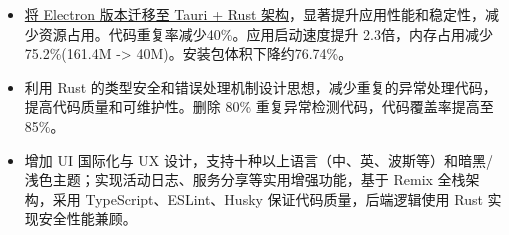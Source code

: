 \documentclass{resume}
\newcommand{\en}[1]{}
\newcommand{\zh}[1]{#1}
\begin{document}
\en{\datedsubsection{\textbf{\href{https://github.com/shaonhuang/V2rayX}{V2rayX (Rust/Tauri 2 Refactor)}}}{}}
\zh{}
\begin{itemize}
    \item \en{Led the migration of V2rayX from Electron to a modern Rust + Tauri architecture, achieving substantial performance improvements. Reduced code duplication by 40\%, improved startup speed by 2.3x, decreased memory usage by 75.2\%, and minimized installer size by 76.74\%.}
          \zh{\href{\detokenize{https://shaonhuang.vercel.app/posts/v2rayx-refactor}}{将 Electron 版本迁移至 Tauri + Rust 架构}，显著提升应用性能和稳定性，减少资源占用。代码重复率减少40\%。应用启动速度提升 2.3倍，内存占用减少 75.2\%(161.4M -> 40M)。安装包体积下降约76.74\%。}
    \item \en{Applied advanced Rust paradigms for type safety and error handling, eliminating 80\% of redundant exception logic and increasing code coverage to 85\%.}
          \zh{利用 Rust 的类型安全和错误处理机制设计思想，减少重复的异常处理代码，提高代码质量和可维护性。删除 80\% 重复异常检测代码，代码覆盖率提高至 85\%。}
    \item \en{Implemented comprehensive UI internationalization (10+ languages) and major UX enhancements including dark/light themes and activity logging. Built with Remix architecture using TypeScript, ESLint, and Husky for code quality.}
          \zh{增加 UI 国际化与 UX 设计，支持十种以上语言（中、英、波斯等）和暗黑/浅色主题；实现活动日志、服务分享等实用增强功能，基于 Remix 全栈架构，采用 TypeScript、ESLint、Husky 保证代码质量，后端逻辑使用 Rust 实现安全性能兼顾。}
\end{itemize}
\end{document}
